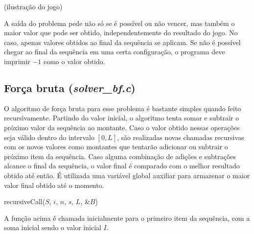 \documentclass[10pt,a4paper]{article}
\numberwithin{equation}{section}
\begin{document}
(ilustração do jogo)

A saída do problema pede não só se é possível ou não vencer, mas também o maior valor que pode ser obtido, independentemente do resultado do jogo. No caso, apenas valores obtidos ao final da sequência se aplicam. Se não é possível chegar ao final da sequência em uma certa configuração, o programa deve imprimir $-1$ como o valor obtido.

\subsection{Força bruta (\emph{solver\_bf.c})}

O algoritmo de força bruta para esse problema é bastante simples quando feito recursivamente. Partindo do valor inicial, o algoritmo tenta somar e subtrair o próximo valor da sequência ao montante. Caso o valor obtido nessas operações seja válido dentro do intervalo $[0,L]$, são realizadas novas chamadas recursivas com os novos valores como montantes que tentarão adicionar ou subtrair o próximo item da sequência. Caso alguma combinação de adições e subtrações alcance o final da sequência, o valor final é comparado com o melhor resultado obtido até então. É utilizada uma variável global auxiliar para armazenar o maior valor final obtido até o momento.

\begin{function}[H]
    \caption{recursiveCall($S$, $i$, $n$, $s$, $L$, \&$B$)}

    \BlankLine


\end{function}

A função acima é chamada inicialmente para o primeiro item da sequência, com a soma inicial sendo o valor inicial $I$.
\end{document}
